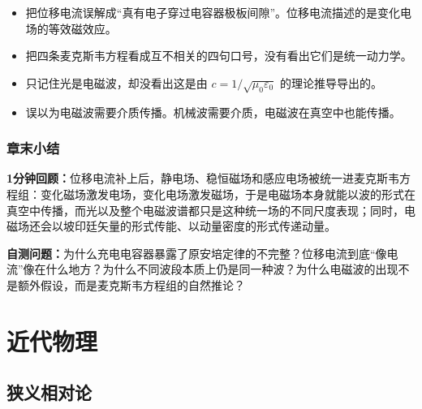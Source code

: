 \documentclass[lang=cn,11pt]{elegantbook}
\newcommand{\summaryline}[1]{\par\noindent\textbf{1分钟回顾：}#1\par}
\newcommand{\chapterselfcheck}[1]{\par\noindent\textbf{自测问题：}#1\par}
\begin{document}
\begin{itemize}
 \item 把位移电流误解成“真有电子穿过电容器极板间隙”。位移电流描述的是变化电场的等效磁效应。
 \item 把四条麦克斯韦方程看成互不相关的四句口号，没有看出它们是统一动力学。
 \item 只记住光是电磁波，却没看出这是由 \(c=1/\sqrt{\mu_0\varepsilon_0}\) 的理论推导导出的。
 \item 误以为电磁波需要介质传播。机械波需要介质，电磁波在真空中也能传播。
\end{itemize}

\section{章末小结}

\summaryline{位移电流补上后，静电场、稳恒磁场和感应电场被统一进麦克斯韦方程组：变化磁场激发电场，变化电场激发磁场，于是电磁场本身就能以波的形式在真空中传播，而光以及整个电磁波谱都只是这种统一场的不同尺度表现；同时，电磁场还会以坡印廷矢量的形式传能、以动量密度的形式传递动量。}
\chapterselfcheck{为什么充电电容器暴露了原安培定律的不完整？位移电流到底“像电流”像在什么地方？为什么不同波段本质上仍是同一种波？为什么电磁波的出现不是额外假设，而是麦克斯韦方程组的自然推论？}

\part{近代物理}

\chapter{狭义相对论}
\end{document}
